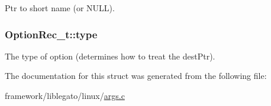 Ptr to short name (or N\+U\+LL). 

\subsubsection[{\texorpdfstring{type}{type}}]{ Option\+Rec\+\_\+t\+::type}\hypertarget{struct_option_rec__t_ac01c1f69b8fb0b62ed50d701049b5862}{}\label{struct_option_rec__t_ac01c1f69b8fb0b62ed50d701049b5862}


The type of option (determines how to treat the dest\+Ptr). 



The documentation for this struct was generated from the following file\+:\begin{DoxyCompactItemize}
\item 
framework/liblegato/linux/\hyperlink{args_8c}{args.\+c}\end{DoxyCompactItemize}
